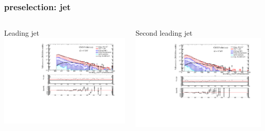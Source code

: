 \documentclass[bigger]{beamer}
\begin{document}
\begin{frame}
\frametitle{\eejj preselection: jet \pt}
\label{sec-1-1-2}
\begin{columns}
\begin{column}{0.6\textwidth}
\label{sec-1-1-2-1}

\centering
Leading jet \pt
\includegraphics[width=\textwidth]{fig/ee/preselection/Pt1stJet_PAS_eejj.pdf}
\end{column}
\begin{column}{0.6\textwidth}
\label{sec-1-1-2-2}

\centering
Second leading jet \pt
\includegraphics[width=\textwidth]{fig/ee/preselection/Pt2ndJet_PAS_eejj.pdf}
\end{column}
\end{columns}
\end{frame}
\end{document}
